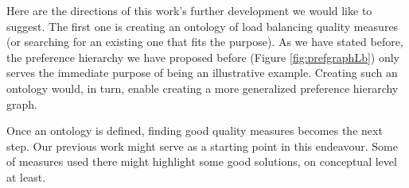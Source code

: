 Here are the directions of this work's further development we would like to suggest.
The first one is creating an ontology of load balancing quality measures (or searching for an existing one that fits the purpose).
As we have stated before, the preference hierarchy we have proposed before (Figure \ref{fig:prefgraphLb}) only serves the immediate purpose of being an illustrative example.
Creating such an ontology would, in turn, enable creating a more generalized preference hierarchy graph.

Once an ontology is defined, finding good quality measures becomes the next step.
Our previous work \cite{murashov-2022} might serve as a starting point in this endeavour.
Some of measures used there might highlight some good solutions, on conceptual level at least.
